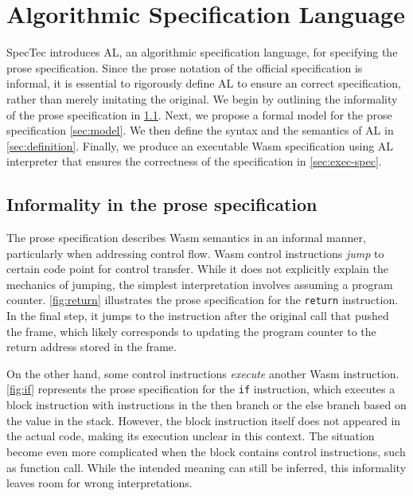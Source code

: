 \chapter{Algorithmic Specification Language}
\label{ch:al}
\noindent


SpecTec introduces AL, an algorithmic specification language, for specifying
the prose specification.
Since the prose notation of the official specification is informal, it is
essential to rigorously define AL to ensure an correct specification, rather
than merely imitating the original.
We begin by outlining the informality of the prose specification in
\cref{sec:prose-informal}.
Next, we propose a formal model for the prose specification \cref{sec:model}.
We then define the syntax and the semantics of AL in \cref{sec:definition}.
Finally, we produce an executable Wasm specification using AL interpreter that
ensures the correctness of the specification in \cref{sec:exec-spec}.

\section{Informality in the prose specification}
\label{sec:prose-informal}

The prose specification describes Wasm semantics in an informal manner,
particularly when addressing control flow.
Wasm control instructions \textit{jump} to certain code point for control
transfer.
While it does not explicitly explain the mechanics of jumping, the simplest
interpretation involves assuming a program counter.
\cref{fig:return} illustrates the prose specification for the \texttt{return}
instruction.
In the final step, it jumps to the instruction after the original call that
pushed the frame, which likely corresponds to updating the program counter to
the return address stored in the frame.


On the other hand, some control instructions \textit{execute} another Wasm
instruction.
\cref{fig:if} represents the prose specification for the \texttt{if}
instruction, which executes a block instruction with instructions in the then
branch or the else branch based on the value in the stack.
However, the block instruction itself does not appeared in the actual code,
making its execution unclear in this context.
The situation become even more complicated when the block contains control
instructions, such as function call.
While the intended meaning can still be inferred, this informality leaves room
for wrong interpretations.


